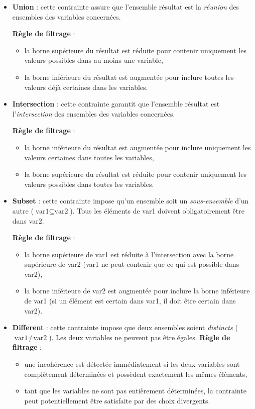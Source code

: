 \documentclass{article}
\begin{document}
\begin{itemize}
    \item \textbf{Union} : cette contrainte assure que l'ensemble résultat est la \emph{réunion} des ensembles des variables concernées. 
    
    \textbf{Règle de filtrage} : 
    \begin{itemize}
        \item la borne supérieure du résultat est réduite pour contenir uniquement les valeurs possibles dans au moins une variable,
        \item la borne inférieure du résultat est augmentée pour inclure toutes les valeurs déjà certaines dans les variables.
    \end{itemize}


    \item \textbf{Intersection} : cette contrainte garantit que l'ensemble résultat est l'\emph{intersection} des ensembles des variables concernées. 
    
    \textbf{Règle de filtrage} : 
    \begin{itemize}
        \item la borne inférieure du résultat est augmentée pour inclure uniquement les valeurs certaines dans toutes les variables,
        \item la borne supérieure du résultat est réduite pour contenir uniquement les valeurs possibles dans toutes les variables.
    \end{itemize}

    \item \textbf{Subset} : cette contrainte impose qu'un ensemble soit un \emph{sous-ensemble} d'un autre ($\text{var1} \subseteq \text{var2}$). Tous les éléments de var1 doivent obligatoirement être dans var2.

    \textbf{Règle de filtrage} : 
    \begin{itemize}
        \item la borne supérieure de var1 est réduite à l'intersection avec la borne supérieure de var2 (var1 ne peut contenir que ce qui est possible dans var2),
        \item la borne inférieure de var2 est augmentée pour inclure la borne inférieure de var1 (si un élément est certain dans var1, il doit être certain dans var2).
    \end{itemize}

    \item \textbf{Different} : cette contrainte impose que deux ensembles soient \emph{distincts} ($\text{var1} \neq \text{var2}$). Les deux variables ne peuvent pas être égales.
    \textbf{Règle de filtrage} : 
    \begin{itemize}
        \item une incohérence est détectée immédiatement si les deux variables sont complètement déterminées et possèdent exactement les mêmes éléments,
        \item tant que les variables ne sont pas entièrement déterminées, la contrainte peut potentiellement être satisfaite par des choix divergents.
    \end{itemize}



\end{itemize}
\end{document}
